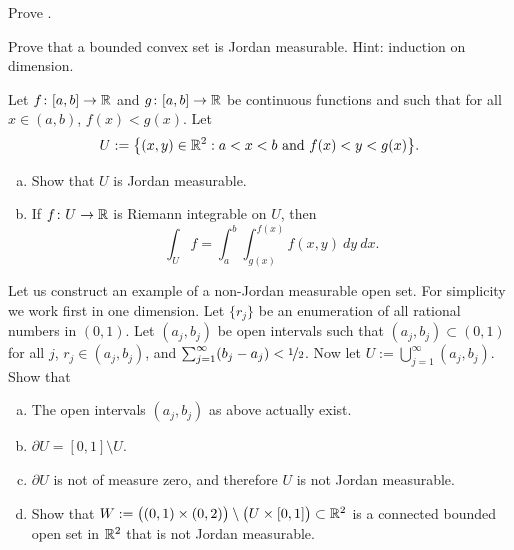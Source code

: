 \begin{exercise}
Prove .
\end{exercise}

\begin{exercise}
Prove that a bounded convex set is Jordan measurable.  Hint: induction on
dimension.
\end{exercise}

\begin{samepage}
\begin{exercise} \label{exercise:intovertypeIset}
Let $f \colon [a,b] \to {\mathbb{R}}$ and
$g \colon [a,b] \to {\mathbb{R}}$ be continuous functions and such that
for all $x \in (a,b)$, $f(x) < g(x)$.  Let
\begin{equation*}
U := \bigl\{ (x,y) \in {\mathbb{R}}^2 : a < x < b \text{ and } f(x) < y < g(x) \bigr\} .
\end{equation*}
\begin{enumerate}[a)]
\item
Show that $U$ is Jordan measurable.
\item
If $f \colon U \to {\mathbb{R}}$ is Riemann integrable on $U$, then
\begin{equation*}
\int_U f =
\int_a^b \int_{g(x)}^{f(x)} f(x,y) ~ dy ~ dx .
\end{equation*}
\end{enumerate}
\end{exercise}
\end{samepage}

\begin{exercise}
Let us construct an example of a non-Jordan measurable open set.  For
simplicity we work first in one dimension.  Let $\{ r_j \}$ be an enumeration
of all rational numbers in $(0,1)$.  Let $(a_j,b_j)$ be open intervals
such that $(a_j,b_j) \subset (0,1)$ for all $j$, $r_j \in (a_j,b_j)$,
and $\sum_{j=1}^\infty (b_j-a_j) < \nicefrac{1}{2}$.  Now let $U :=
\bigcup_{j=1}^\infty (a_j,b_j)$.  Show that
\begin{enumerate}[a)]
\item
The open intervals $(a_j,b_j)$ as above actually exist.
\item
$\partial U = [0,1] \setminus U$.
\item
$\partial U$ is not of measure zero, and therefore $U$ is not Jordan measurable.
\item
Show that $W := \bigl( (0,1) \times (0,2) \bigr) \setminus \bigl( U
\times [0,1] \bigr) \subset {\mathbb{R}}^2$ is a connected bounded open set in ${\mathbb{R}}^2$
that is not Jordan measurable.
\end{enumerate}
\end{exercise}

